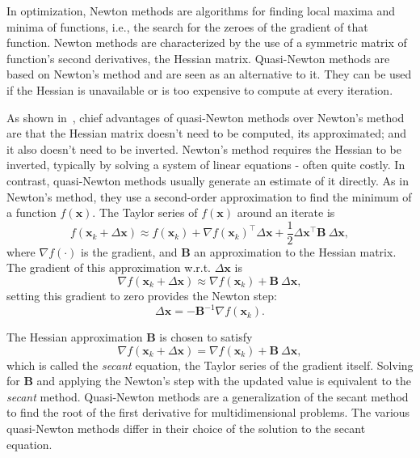 In optimization, Newton methods are algorithms for finding local maxima
and minima of functions, i.e., the search for the zeroes of the gradient
of that function. Newton methods are characterized by the use of a
symmetric matrix of function's second derivatives, the Hessian matrix.
Quasi-Newton methods are based on Newton's method and are seen as an
alternative to it. They can be used if the Hessian is unavailable or is
too expensive to compute at every iteration.

As shown in~, chief advantages of
quasi-Newton methods over Newton's method are that the Hessian matrix
doesn't need to be computed, its approximated; and it also doesn't need
to be inverted. Newton's method requires the Hessian to be inverted,
typically by solving a system of linear equations - often quite costly.
In contrast, quasi-Newton methods usually generate an estimate of it
directly. As in Newton's method, they use a second-order approximation
to find the minimum of a function \(f(\mathbf{x})\). The Taylor series
of \(f(\mathbf{x})\) around an iterate is
\[
  f(\mathbf{x}_{k} + \Delta\mathbf{x}) \approx
  f(\mathbf{x}_{k}) + \nabla f(\mathbf{x}_{k})^{\top} \Delta\mathbf{x} +
  \frac{1}{2} \Delta\mathbf{x}^{\top} \mathbf{B}~\Delta\mathbf{x},
\]
where \(\nabla f(\cdot)\) is the gradient, and \(\mathbf{B}\) an
approximation to the Hessian matrix. The gradient of this approximation
w.r.t. \(\Delta\mathbf{x}\) is
\[
  \nabla f(\mathbf{x}_{k} + \Delta\mathbf{x}) \approx
  \nabla f(\mathbf{x}_{k}) + \mathbf{B}~\Delta\mathbf{x},
\]
setting this gradient to zero provides the Newton step:
\[
  \Delta\mathbf{x} = - \mathbf{B}^{-1} \nabla f(\mathbf{x}_{k}).
\]

The Hessian approximation \(\mathbf{B}\) is chosen to satisfy
\[
  \nabla f(\mathbf{x}_{k} + \Delta\mathbf{x}) =
  \nabla f(\mathbf{x}_{k}) + \mathbf{B}~\Delta\mathbf{x},
\]
which is called the \textit{secant} equation, the Taylor series of the
gradient itself. Solving for \(\mathbf{B}\) and applying the Newton's
step with the updated value is equivalent to the \textit{secant} method.
Quasi-Newton methods are a generalization of the secant method to find
the root of the first derivative for multidimensional problems. The
various quasi-Newton methods differ in their choice of the solution to
the secant equation.

